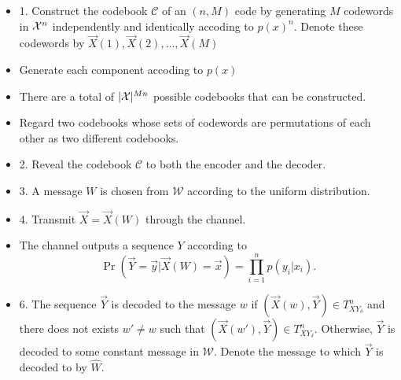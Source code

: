 \documentclass[../main.tex]{subfiles}
\begin{document}
\begin{itemize}
    \item 1. Construct the codebook $\mathcal{C}$ of an $(n,M)$ code by generating $M$ codewords in $\mathcal{X}^n$ independently and identically accoding to $p(x)^n$. Denote these codewords by $\vec X(1),\vec X(2), \dots, \vec X(M)$
    \item Generate each component accoding to $p(x)$
    \item There are a total of $|\mathcal{X}|^{Mn}$ possible codebooks that can be constructed.
    \item Regard two codebooks whose sets of codewords are permutations of each other as two different codebooks.
    \item 2. Reveal the codebook $\mathcal{C}$ to both the encoder and the decoder.
    \item 3. A message $W$ is chosen from $\mathcal{W}$ according to the uniform distribution.
    \item 4. Transmit $\vec X=\vec X(W)$ through the channel.
    \item The channel outputs a sequence $Y$ according to \[
    \Pr(\vec Y=\vec y|\vec X(W)=\vec x) = \prod_{i=1}^np(y_i|x_i).
    \] 
    \item 6. The sequence $\vec Y$ is decoded to the message $w$ if $(\vec X(w), \vec Y)\in T^n_{XY_\delta}$ and there does not exists $w'\neq w$ such that $(\vec X(w'), \vec Y)\in T^n_{XY_\delta}$. Otherwise, $\vec Y$ is decoded to some constant message in $\mathcal{W}$. Denote the message to which $\vec Y$ is decoded to by $\hat{W}.$
\end{itemize}
\end{document}

